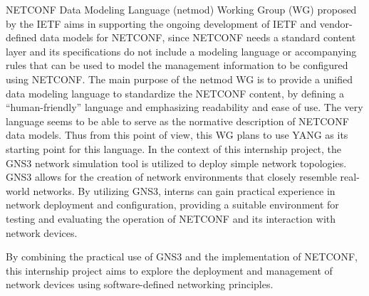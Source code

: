NETCONF Data Modeling Language (netmod) Working Group (WG) proposed by the IETF aims in supporting the ongoing development of IETF and vendor-defined data models for NETCONF, since NETCONF needs a standard content layer and its specifications do not include a modeling language or accompanying rules that can be used to model the management information to be configured using NETCONF. The main purpose of the netmod WG is to provide a unified data modeling language to standardize the NETCONF content, by defining a “human-friendly” language and emphasizing readability and ease of use. The very language seems to be able to serve as the normative description of NETCONF data models. Thus from this point of view, this WG plans to use YANG as its starting point for this language.
In the context of this internship project, the GNS3 network simulation tool is utilized to deploy simple network topologies. GNS3 allows for the creation of network environments that closely resemble real-world networks. By utilizing GNS3, interns can gain practical experience in network deployment and configuration, providing a suitable environment for testing and evaluating the operation of NETCONF and its interaction with network devices.

By combining the practical use of GNS3 and the implementation of NETCONF, this internship project aims to explore the deployment and management of network devices using software-defined networking principles.